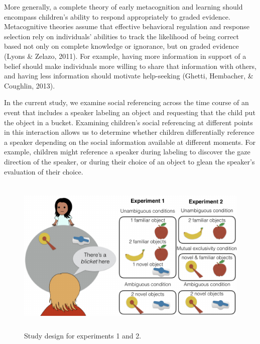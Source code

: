 \documentclass[a4paper,man,apacite,floatsintext]{apa6}
\newenvironment{CodeChunk}{}{}
\begin{document}
More generally, a complete theory of early metacognition and learning
should encompass children's ability to respond appropriately to graded
evidence. Metacognitive theories assume that effective behavioral
regulation and response selection rely on individuals' abilities to
track the likelihood of being correct based not only on complete
knowledge or ignorance, but on graded evidence (Lyons \& Zelazo, 2011).
For example, having more information in support of a belief should make
individuals more willing to share that information with others, and
having less information should motivate help-seeking (Ghetti, Hembacher,
\& Coughlin, 2013).

In the current study, we examine social referencing across the time
course of an event that includes a speaker labeling an object and
requesting that the child put the object in a bucket. Examining
children's social referencing at different points in this interaction
allows us to determine whether children differentially reference a
speaker depending on the social information available at different
moments. For example, children might reference a speaker during labeling
to discover the gaze direction of the speaker, or during their choice of
an object to glean the speaker's evaluation of their choice.

\begin{CodeChunk}
\begin{figure}[b]

{\centering \includegraphics[width=5in,height=3in]{figs/design-1} 

}

\caption[Study design for experiments 1 and 2]{Study design for experiments 1 and 2.}\label{fig:design}
\end{figure}
\end{CodeChunk}
\end{document}

